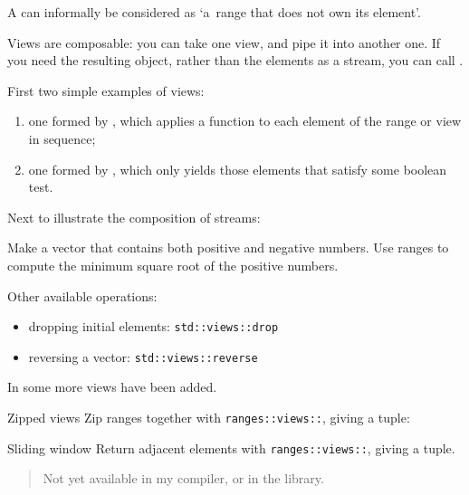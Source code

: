 A  can informally be considered as
`a~range that does not own its element'.

Views are composable: you can take one view, and pipe it into another one.
If you need the resulting object, rather than the elements as a stream,
you can call .

First two simple examples of views:
\begin{enumerate}
\item
  one formed by , which applies
  a function to each element of the range or view in sequence;
\item one formed by , which only
  yields those elements that satisfy some boolean test.
\end{enumerate}


Next to illustrate the composition of streams:


\begin{exercise}
  Make a vector that contains both positive and negative numbers.
  Use ranges to compute the minimum square root of the positive numbers.
\end{exercise}

Other available operations:
\begin{itemize}
\item dropping initial elements: \lstinline+std::views::drop+
\item reversing a vector: \lstinline+std::views::reverse+
\end{itemize}

In  some more views have been added.
\begin{block}{Zipped views}
  \label{sl:range-zip}
  Zip ranges together with \lstinline{ranges::views::},
  giving a tuple:
\end{block}

\begin{block}{Sliding window}
  \label{sl:range-adjacent}
  Return adjacent elements with \lstinline{ranges::views::},
  giving a tuple.
  \begin{quote}
    Not yet available in my compiler, or in the  library.
  \end{quote}
\end{block}


